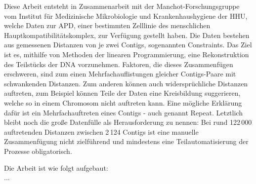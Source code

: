 Diese Arbeit entsteht in Zusammenarbeit mit der Manchot-Forschungsgruppe vom Institut für Medizinische Mikrobiologie und Krankenhaushygiene der HHU, welche Daten zur APD, einer bestimmten Zelllinie des menschlichen Hauptkompatibilitätskomplex, zur Verfügung gestellt haben. 
Die Daten bestehen aus gemessenen Distanzen von je zwei Contigs, sogenannten Constraints. 
Das Ziel ist es, mithilfe von Methoden der linearen Programmierung, eine Rekonstruktion des Teilstücks der DNA vorzunehmen. Faktoren, die dieses Zusammenfügen erschweren, sind zum einen Mehrfachauflistungen gleicher Contigs-Paare mit schwankenden Distanzen. Zum anderen können auch widersprüchliche Distanzen auftreten, zum Beispiel können Teile der Daten eine Kreisbildung suggerieren, welche so in einem Chromosom nicht auftreten kann. Eine mögliche Erklärung dafür ist ein Mehrfachauftreten eines Contigs - auch genannt Repeat. Letztlich bleibt noch die große Datenfülle als Herausforderung zu nennen: Bei rund 122\,000 auftretenden Distanzen zwischen 2\,124 Contigs ist eine manuelle Zusammenfügung nicht zielführend und mindestens eine Teilautomatisierung der Prozesse obligatorisch.

Die Arbeit ist wie folgt aufgebaut:\\


...